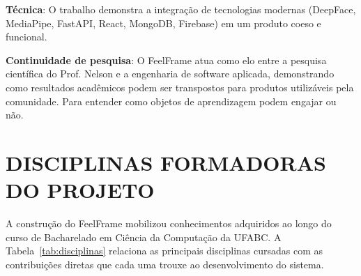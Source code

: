 \documentclass[
	12pt,
	openright,
	oneside,
	a4paper,
	english,
	brazil
	]{abntex2}
\begin{document}
\textbf{Técnica}: O trabalho demonstra a integração de tecnologias modernas (DeepFace, MediaPipe, FastAPI, React, MongoDB, Firebase) em um produto coeso e funcional.

\textbf{Continuidade de pesquisa}: O FeelFrame atua como elo entre a pesquisa científica do Prof. Nelson \cite{nascimento2024nelson} e a engenharia de software aplicada, demonstrando como resultados acadêmicos podem ser transpostos para produtos utilizáveis pela comunidade. Para entender como objetos de aprendizagem podem engajar ou não.

\section{DISCIPLINAS FORMADORAS DO PROJETO}

A construção do FeelFrame mobilizou conhecimentos adquiridos ao longo do curso de Bacharelado em Ciência da Computação da UFABC. A Tabela~\ref{tab:disciplinas} relaciona as principais disciplinas cursadas com as contribuições diretas que cada uma trouxe ao desenvolvimento do sistema.
\end{document}
